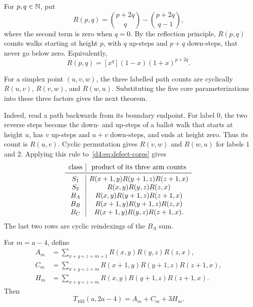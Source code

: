 For $p,q\in\mathbb N$, put
\begin{equation}\label{d4:eq:R}
 R(p,q)=\binom{p+2q}{q}-\binom{p+2q}{q-1},
\end{equation}
where the second term is zero when $q=0$.  By the reflection principle,
$R(p,q)$ counts walks starting at height $p$, with $q$ up-steps and $p+q$
down-steps, that never go below zero.  Equivalently,
\begin{equation}\label{d4:eq:R-coeff}
 R(p,q)=[x^q](1-x)(1+x)^{p+2q}.
\end{equation}

For a simplex point $(u,v,w)$, the three labelled path counts are cyclically
$R(u,v)$, $R(v,w)$, and $R(w,u)$.  Substituting the five core
parameterizations into these three factors gives the next theorem.

Indeed, read a path backwards from its boundary endpoint.  For label $0$, the
two reverse steps become the down- and up-steps of a ballot walk that starts
at height $u$, has $v$ up-steps and $u+v$ down-steps, and ends at height zero.
Thus its count is $R(u,v)$.  Cyclic permutation gives $R(v,w)$ and $R(w,u)$
for labels $1$ and $2$.  Applying this rule to~\eqref{d4:eq:defect-cores} gives
\[
\begin{array}{c|c}
\text{class}&\text{product of its three arm counts}\\ \midrule
S_1&R(x+1,y)R(y+1,z)R(z+1,x)\\
S_2&R(x,y)R(y,z)R(z,x)\\
B_A&R(x,y)R(y+1,z)R(z+1,x)\\
B_B&R(x+1,y)R(y+1,z)R(z,x)\\
B_C&R(x+1,y)R(y,z)R(z+1,x).
\end{array}
\]
The last two rows are cyclic reindexings of the $B_A$ sum.

\begin{theorem}\label{d4:thm:d4-sum}
For $m=a-4$, define
\begin{align}
 A_m&=\sum_{x+y+z=m+1}R(x,y)R(y,z)R(z,x),\label{d4:eq:A}\\
 C_m&=\sum_{x+y+z=m}R(x+1,y)R(y+1,z)R(z+1,x),\label{d4:eq:C}\\
 H_m&=\sum_{x+y+z=m}R(x,y)R(y+1,z)R(z+1,x).\label{d4:eq:H}
\end{align}
Then
\begin{equation}\label{d4:eq:ballot-sum}
 T_{103}(a,2a-4)=A_m+C_m+3H_m.
\end{equation}
\end{theorem}

